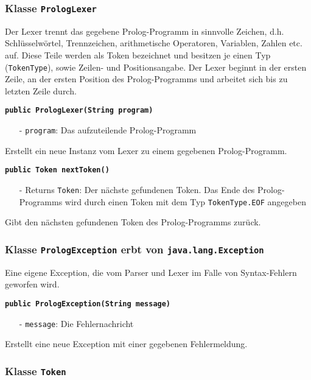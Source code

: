 \documentclass[parskip=full,11pt,twoside]{scrartcl}
\begin{document}
\subsubsection{Klasse \texttt{PrologLexer}}

Der Lexer trennt das gegebene Prolog-Programm in sinnvolle Zeichen, d.h. Schlüsselwörtel, Trennzeichen, arithmetische Operatoren, Variablen, Zahlen etc. auf. Diese Teile werden als Token bezeichnet und besitzen je einen Typ (\texttt{TokenType}), sowie Zeilen- und Positionsangabe. Der Lexer beginnt in der ersten Zeile, an der ersten Position des Prolog-Programms und arbeitet sich bis zu letzten Zeile durch.

\textbf{\texttt{public PrologLexer(String program)}}
\begin{itemize}[noitemsep]
	\item[-] \texttt{program}: Das aufzuteilende Prolog-Programm
\end{itemize}
Erstellt ein neue Instanz vom Lexer zu einem gegebenen Prolog-Programm.

\textbf{\texttt{public Token nextToken()}}
\begin{itemize}[noitemsep]
	\item[-] Returns \texttt{Token}: Der nächste gefundenen Token. Das Ende des Prolog-Programms wird durch einen Token mit dem Typ \texttt{TokenType.EOF} angegeben
\end{itemize}
Gibt den nächsten gefundenen Token des Prolog-Programms zurück.

\subsubsection{Klasse \texttt{PrologException} erbt von \texttt{java.lang.Exception}}

Eine eigene Exception, die vom Parser und Lexer im Falle von Syntax-Fehlern geworfen wird.

\textbf{\texttt{public PrologException(String message)}}
\begin{itemize}[noitemsep]
	\item[-] \texttt{message}: Die Fehlernachricht
\end{itemize}
Erstellt eine neue Exception mit einer gegebenen Fehlermeldung.

\subsubsection{Klasse \texttt{Token}}
\end{document}
